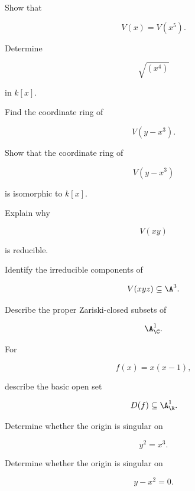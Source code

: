 \begin{exercise}[2]
Show that

\[
V(x)=V(x^5).
\]
\end{exercise}

\begin{exercise}[2]
Determine

\[
\sqrt{(x^4)}
\]

in \(k[x]\).
\end{exercise}

\begin{exercise}[2]
Find the coordinate ring of

\[
V(y-x^3).
\]
\end{exercise}

\begin{exercise}[2]
Show that the coordinate ring of

\[
V(y-x^3)
\]

is isomorphic to \(k[x]\).
\end{exercise}

\begin{exercise}[2]
Explain why

\[
V(xy)
\]

is reducible.
\end{exercise}

\begin{exercise}[2]
Identify the irreducible components of

\[
V(xyz)
\subseteq\A^3.
\]
\end{exercise}

\begin{exercise}[2]
Describe the proper Zariski-closed subsets of

\[
\A^1_{\C}.
\]
\end{exercise}

\begin{exercise}[2]
For

\[
f(x)=x(x-1),
\]

describe the basic open set

\[
D(f)
\subseteq\A^1_{\R}.
\]
\end{exercise}

\begin{exercise}[2]
Determine whether the origin is singular on

\[
y^2=x^3.
\]
\end{exercise}

\begin{exercise}[2]
Determine whether the origin is singular on

\[
y-x^2=0.
\]
\end{exercise}

